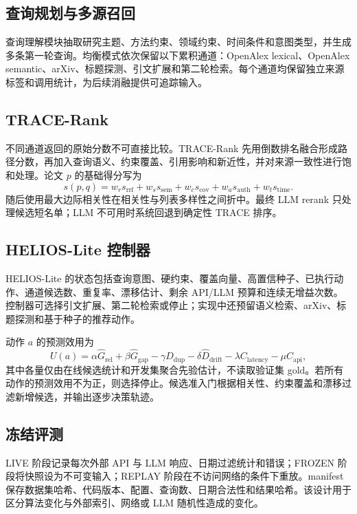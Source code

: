 \documentclass[a4paper,11pt]{ctexart}
\begin{document}
\subsection{查询规划与多源召回}
查询理解模块抽取研究主题、方法约束、领域约束、时间条件和意图类型，并生成多条第一轮查询。均衡模式依次保留以下累积通道：OpenAlex lexical、OpenAlex semantic、arXiv、标题探测、引文扩展和第二轮检索。每个通道均保留独立来源标签和调用统计，为后续消融提供可追踪输入。

\subsection{TRACE-Rank}
不同通道返回的原始分数不可直接比较。TRACE-Rank 先用倒数排名融合形成路径分数，再加入查询语义、约束覆盖、引用影响和新近性，并对来源一致性进行饱和处理。论文 $p$ 的基础得分写为
\begin{equation}
s(p,q)=w_r s_{\mathrm{rrf}}+w_s s_{\mathrm{sem}}+w_c s_{\mathrm{cov}}+w_a s_{\mathrm{auth}}+w_t s_{\mathrm{time}}.
\end{equation}
随后使用最大边际相关性在相关性与列表多样性之间折中。最终 LLM rerank 只处理候选短名单；LLM 不可用时系统回退到确定性 TRACE 排序。

\subsection{HELIOS-Lite 控制器}
HELIOS-Lite 的状态包括查询意图、硬约束、覆盖向量、高置信种子、已执行动作、通道候选数、重复率、漂移估计、剩余 API/LLM 预算和连续无增益次数。控制器可选择引文扩展、第二轮检索或停止；实现中还预留语义检索、arXiv、标题探测和基于种子的推荐动作。

动作 $a$ 的预测效用为
\begin{equation}
U(a)=\alpha \widehat{G}_{\mathrm{rel}}+\beta \widehat{G}_{\mathrm{gap}}
-\gamma \widehat{D}_{\mathrm{dup}}-\delta \widehat{D}_{\mathrm{drift}}
-\lambda C_{\mathrm{latency}}-\mu C_{\mathrm{api}},
\end{equation}
其中各量仅由在线候选统计和开发集聚合先验估计，不读取验证集 gold。若所有动作的预测效用不为正，则选择停止。候选准入门根据相关性、约束覆盖和漂移过滤新增候选，并输出逐步决策轨迹。

\subsection{冻结评测}
LIVE 阶段记录每次外部 API 与 LLM 响应、日期过滤统计和错误；FROZEN 阶段将快照设为不可变输入；REPLAY 阶段在不访问网络的条件下重放。manifest 保存数据集哈希、代码版本、配置、查询数、日期合法性和结果哈希。该设计用于区分算法变化与外部索引、网络或 LLM 随机性造成的变化。
\end{document}
